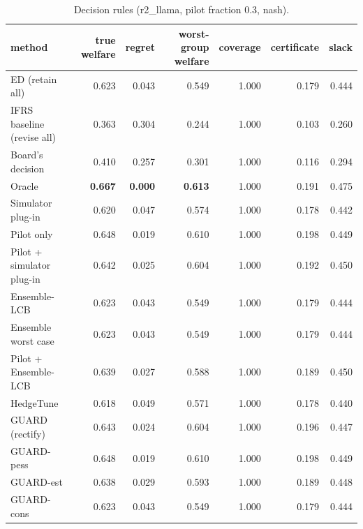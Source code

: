 \begin{table}[t]
\centering
\small
\begin{tabular}{lrrrrrr}
\toprule
method & true welfare & regret & worst-group welfare & coverage & certificate & slack \\
\midrule
ED (retain all) & 0.623 & 0.043 & 0.549 & 1.000 & 0.179 & 0.444 \\
IFRS baseline (revise all) & 0.363 & 0.304 & 0.244 & 1.000 & 0.103 & 0.260 \\
Board's decision & 0.410 & 0.257 & 0.301 & 1.000 & 0.116 & 0.294 \\
Oracle & \textbf{0.667} & \textbf{0.000} & \textbf{0.613} & 1.000 & 0.191 & 0.475 \\
Simulator plug-in & 0.620 & 0.047 & 0.574 & 1.000 & 0.178 & 0.442 \\
Pilot only & 0.648 & 0.019 & 0.610 & 1.000 & 0.198 & 0.449 \\
Pilot + simulator plug-in & 0.642 & 0.025 & 0.604 & 1.000 & 0.192 & 0.450 \\
Ensemble-LCB & 0.623 & 0.043 & 0.549 & 1.000 & 0.179 & 0.444 \\
Ensemble worst case & 0.623 & 0.043 & 0.549 & 1.000 & 0.179 & 0.444 \\
Pilot + Ensemble-LCB & 0.639 & 0.027 & 0.588 & 1.000 & 0.189 & 0.450 \\
HedgeTune & 0.618 & 0.049 & 0.571 & 1.000 & 0.178 & 0.440 \\
GUARD (rectify) & 0.643 & 0.024 & 0.604 & 1.000 & 0.196 & 0.447 \\
GUARD-pess & 0.648 & 0.019 & 0.610 & 1.000 & 0.198 & 0.449 \\
GUARD-est & 0.638 & 0.029 & 0.593 & 1.000 & 0.189 & 0.448 \\
GUARD-cons & 0.623 & 0.043 & 0.549 & 1.000 & 0.179 & 0.444 \\
\bottomrule
\end{tabular}
\caption{Decision rules (r2\_llama, pilot fraction 0.3, nash).}
\label{tab:methods-nash}
\end{table}
